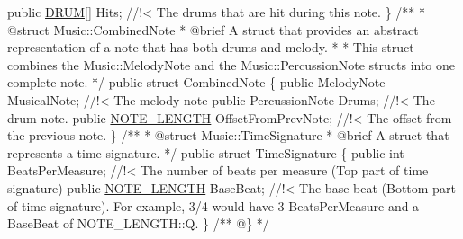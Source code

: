 \begin{DoxyCodeInclude}
\textcolor{comment}{}        \textcolor{keyword}{public} \hyperlink{group___music_enums_gade475b4382c7066d1af13e7c13c029b6}{DRUM}[] Hits; \textcolor{comment}{//!< The drums that are hit during this note.}
\textcolor{comment}{}    \}
\textcolor{comment}{}
\textcolor{comment}{    /**}
\textcolor{comment}{     * @struct Music::CombinedNote}
\textcolor{comment}{     * @brief A struct that provides an abstract representation of a note that has both drums and melody.}
\textcolor{comment}{     * }
\textcolor{comment}{     * This struct combines the Music::MelodyNote and the Music::PercussionNote structs into one complete
       note.}
\textcolor{comment}{    */}
    \textcolor{keyword}{public} \textcolor{keyword}{struct }CombinedNote
    \{
        \textcolor{keyword}{public} MelodyNote MusicalNote; \textcolor{comment}{//!< The melody note}
\textcolor{comment}{}        \textcolor{keyword}{public} PercussionNote Drums; \textcolor{comment}{//!< The drum note.}
\textcolor{comment}{}        \textcolor{keyword}{public} \hyperlink{group___music_enums_gaf11b5f079adbb21c800b9eca1c5c3cbd}{NOTE\_LENGTH} OffsetFromPrevNote; \textcolor{comment}{//!< The offset from the previous note.}
\textcolor{comment}{}    \}
\textcolor{comment}{}
\textcolor{comment}{    /** }
\textcolor{comment}{     * @struct Music::TimeSignature}
\textcolor{comment}{     * @brief A struct that represents a time signature.}
\textcolor{comment}{    */}
    \textcolor{keyword}{public} \textcolor{keyword}{struct }TimeSignature
    \{
        \textcolor{keyword}{public} \textcolor{keywordtype}{int} BeatsPerMeasure; \textcolor{comment}{//!< The number of beats per measure (Top part of time signature)}
\textcolor{comment}{}        \textcolor{keyword}{public} \hyperlink{group___music_enums_gaf11b5f079adbb21c800b9eca1c5c3cbd}{NOTE\_LENGTH} BaseBeat; \textcolor{comment}{//!< The base beat (Bottom part of time signature). For
       example, 3/4 would have 3 BeatsPerMeasure and a BaseBeat of NOTE\_LENGTH::Q. }
\textcolor{comment}{}    \}
\textcolor{comment}{}
\textcolor{comment}{    /** @\} */}


\end{DoxyCodeInclude}
